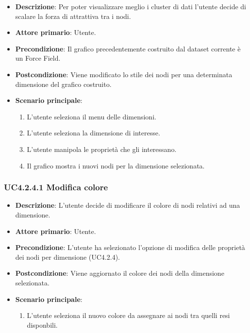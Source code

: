 \begin{itemize}
    \item \textbf{Descrizione}: Per poter visualizzare meglio i cluster di dati l’utente 
                                decide di scalare la forza di attrattiva tra i nodi.

	
    \item \textbf{Attore primario}: Utente.
    
    \item \textbf{Precondizione}:   Il grafico precedentemente costruito dal dataset corrente è un Force Field.

    \item \textbf{Postcondizione}:  Viene modificato lo stile dei nodi per una determinata dimensione del grafico costruito.

	\item \textbf{Scenario principale}:
        \begin{enumerate}
        
            \item L'utente seleziona il menu delle dimensioni.
            \item L'utente seleziona la dimensione di interesse.
            \item L'utente manipola le proprietà che gli interessano.
            \item Il grafico mostra i nuovi nodi per la dimensione selezionata.
                
        \end{enumerate}
\end{itemize}


\subsubsection{UC4.2.4.1 Modifica colore}

\begin{itemize}
    \item \textbf{Descrizione}: L'utente decide di modificare il colore di nodi relativi ad una dimensione.

	
    \item \textbf{Attore primario}: Utente.
    
    \item \textbf{Precondizione}:   L'utente ha selezionato l'opzione di modifica delle proprietà dei nodi per dimensione (UC4.2.4).
    \item \textbf{Postcondizione}:  Viene aggiornato il colore dei nodi della dimensione selezionata.

	\item \textbf{Scenario principale}:
        \begin{enumerate}
            \item L'utente seleziona il nuovo colore da assegnare ai nodi tra quelli resi disponbili.
        \end{enumerate}
\end{itemize}

